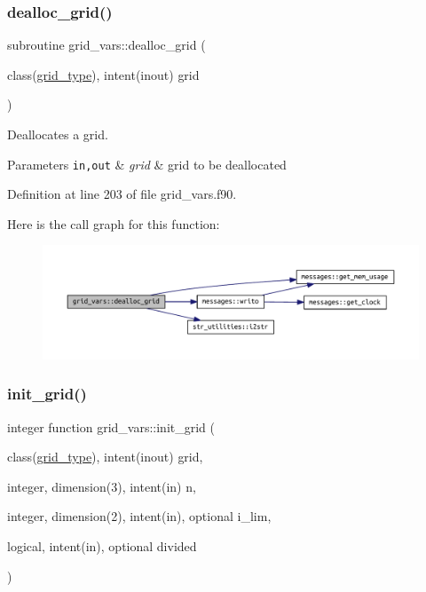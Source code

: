 \subsubsection{\texorpdfstring{dealloc\+\_\+grid()}{dealloc\_grid()}}
{\footnotesize\ttfamily subroutine grid\+\_\+vars\+::dealloc\+\_\+grid (\begin{DoxyParamCaption}\item[{class(\hyperlink{structgrid__vars_1_1grid__type}{grid\+\_\+type}), intent(inout)}]{grid }\end{DoxyParamCaption})}



Deallocates a grid. 


\begin{DoxyParams}[1]{Parameters}
\mbox{\tt in,out}  & {\em grid} & grid to be deallocated \\
\hline
\end{DoxyParams}


Definition at line 203 of file grid\+\_\+vars.\+f90.

Here is the call graph for this function\+:\nopagebreak
\begin{figure}[H]
\begin{center}
\leavevmode
\includegraphics[width=350pt]{namespacegrid__vars_abc8ea59261a1e773754afebdb13276f9_cgraph}
\end{center}
\end{figure}
\mbox{\label{namespacegrid__vars_aa0d888796fd875e9024443e46eeb11f8}} 
\subsubsection{\texorpdfstring{init\+\_\+grid()}{init\_grid()}}
{\footnotesize\ttfamily integer function grid\+\_\+vars\+::init\+\_\+grid (\begin{DoxyParamCaption}\item[{class(\hyperlink{structgrid__vars_1_1grid__type}{grid\+\_\+type}), intent(inout)}]{grid,  }\item[{integer, dimension(3), intent(in)}]{n,  }\item[{integer, dimension(2), intent(in), optional}]{i\+\_\+lim,  }\item[{logical, intent(in), optional}]{divided }\end{DoxyParamCaption})}



